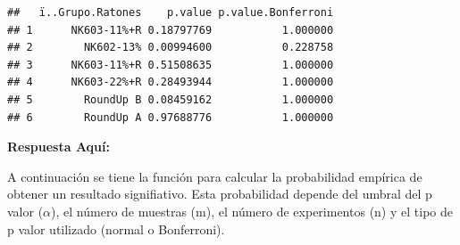 \documentclass[]{article}
\newenvironment{Shaded}{\begin{snugshade}}{\end{snugshade}}
\newcommand{\AttributeTok}[1]{\textcolor[rgb]{0.77,0.63,0.00}{#1}}
\newcommand{\CommentTok}[1]{\textcolor[rgb]{0.56,0.35,0.01}{\textit{#1}}}
\newcommand{\ConstantTok}[1]{\textcolor[rgb]{0.00,0.00,0.00}{#1}}
\newcommand{\ControlFlowTok}[1]{\textcolor[rgb]{0.13,0.29,0.53}{\textbf{#1}}}
\newcommand{\DecValTok}[1]{\textcolor[rgb]{0.00,0.00,0.81}{#1}}
\newcommand{\FunctionTok}[1]{\textcolor[rgb]{0.00,0.00,0.00}{#1}}
\newcommand{\NormalTok}[1]{#1}
\newcommand{\OtherTok}[1]{\textcolor[rgb]{0.56,0.35,0.01}{#1}}
\newcommand{\SpecialCharTok}[1]{\textcolor[rgb]{0.00,0.00,0.00}{#1}}
\begin{document}
\begin{verbatim}
##   ï..Grupo.Ratones    p.value p.value.Bonferroni
## 1      NK603-11%+R 0.18797769           1.000000
## 2        NK602-13% 0.00994600           0.228758
## 3      NK603-11%+R 0.51508635           1.000000
## 4      NK603-22%+R 0.28493944           1.000000
## 5        RoundUp B 0.08459162           1.000000
## 6        RoundUp A 0.97688776           1.000000
\end{verbatim}

\textbf{Respuesta Aquí:}

A continuación se tiene la función para calcular la probabilidad
empírica de obtener un resultado signifiativo. Esta probabilidad depende
del umbral del p valor (\(\alpha\)), el número de muestras (m), el
número de experimentos (n) y el tipo de p valor utilizado (normal o
Bonferroni).

\begin{Shaded}
\end{Shaded}
\end{document}
